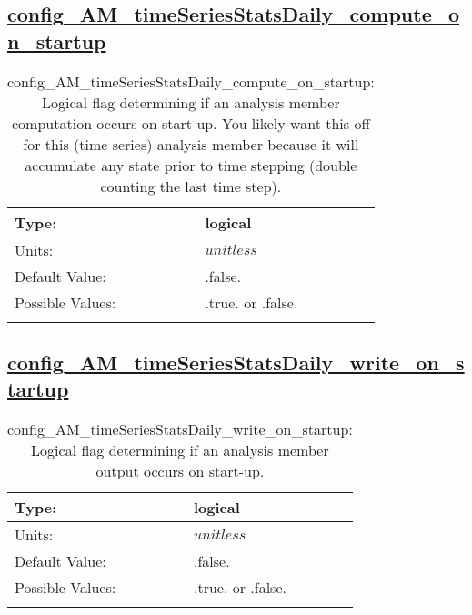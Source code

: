 \subsection[config\_AM\_timeSeriesStatsDaily\_compute\_on\_startup]{\hyperref[sec:nm_tab_AM_timeSeriesStatsDaily]{config\_AM\_timeSeriesStatsDaily\_compute\_on\_startup}}
\label{subsec:nm_sec_config_AM_timeSeriesStatsDaily_compute_on_startup}
\begin{center}
\begin{longtable}{| p{2.0in} || p{4.0in} |}
    \hline
    Type: & logical \\
    \hline
    Units: & $unitless$ \\
    \hline
    Default Value: & .false. \\
    \hline
    Possible Values: & .true. or .false. \\
    \hline
    \caption{config\_AM\_timeSeriesStatsDaily\_compute\_on\_startup: Logical flag determining if an analysis member computation occurs on start-up. You likely want this off for this (time series) analysis member because it will accumulate any state prior to time stepping (double counting the last time step).}
\end{longtable}
\end{center}
\subsection[config\_AM\_timeSeriesStatsDaily\_write\_on\_startup]{\hyperref[sec:nm_tab_AM_timeSeriesStatsDaily]{config\_AM\_timeSeriesStatsDaily\_write\_on\_startup}}
\label{subsec:nm_sec_config_AM_timeSeriesStatsDaily_write_on_startup}
\begin{center}
\begin{longtable}{| p{2.0in} || p{4.0in} |}
    \hline
    Type: & logical \\
    \hline
    Units: & $unitless$ \\
    \hline
    Default Value: & .false. \\
    \hline
    Possible Values: & .true. or .false. \\
    \hline
    \caption{config\_AM\_timeSeriesStatsDaily\_write\_on\_startup: Logical flag determining if an analysis member output occurs on start-up.}
\end{longtable}
\end{center}
